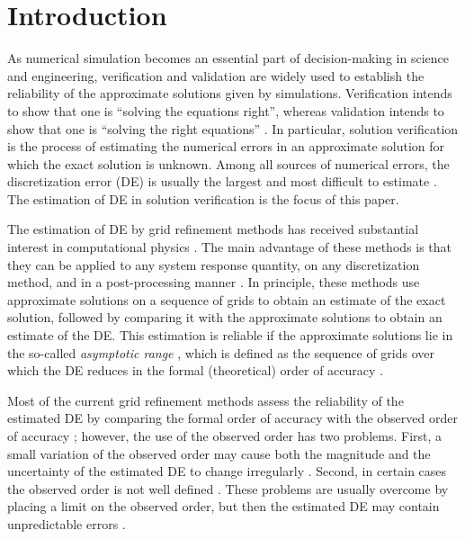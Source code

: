 \section{Introduction} \label{sec:intro}
As numerical simulation becomes an essential part of decision-making in science and engineering, verification and validation \citep{Roache1998VerificationEngineering,Stern2001ComprehensiveProcedures,OberkampfRoy2010} are widely used to establish the reliability of the approximate solutions given by simulations. Verification intends to show that one is ``solving the equations right'', whereas validation intends to show that one is ``solving the right equations'' \citep{Roache1998article}. In particular, solution verification is the process of estimating the numerical errors in an approximate solution for which the exact solution is unknown. Among all sources of numerical errors, the discretization error (DE) is usually the largest and most difficult to estimate \citep{Roy2005,Eca2014AStudies}. The estimation of DE in solution verification is the focus of this paper.

The estimation of DE by grid refinement methods \citep{Roy2010} has received substantial interest in computational physics \citep{Roache1994Perspective:Studies,Eca2014AStudies,Phillips2016ADynamics,Rider2016RobustAnalysis}. The main advantage of these methods is that they can be applied to any system response quantity, on any discretization method, and in a post-processing manner \citep{Stern2001ComprehensiveProcedures,Roy2010}. In principle, these methods use approximate solutions on a sequence of grids to obtain an estimate of the exact solution, followed by comparing it with the approximate solutions to obtain an estimate of the DE. This estimation is reliable if the approximate solutions lie in the so-called \textit{asymptotic range} \citep{Salas2006,Xing2010,Roy2010,Phillips2016ADynamics,Eca2018}, which is defined as the sequence of grids over which the DE reduces in the formal (theoretical) order of accuracy \citep{Roy2010}.

Most of the current grid refinement methods assess the reliability of the estimated DE by comparing the formal order of accuracy with the observed order of accuracy \citep{Roy2010,Orozco2010VerificationSolutions}; however, the use of the observed order has two problems. First, a small variation of the observed order may cause both the magnitude and the uncertainty of the estimated DE to change irregularly \citep{Roy2003,Eca2009,Xing2010,Hodis2012GridAneurysms}. Second, in certain cases the observed order is not well defined \citep{Roy2003,Phillips2014RichardsonDynamics,Phillips2016ADynamics}. These problems are usually overcome by placing a limit on the observed order, but then the estimated DE may contain unpredictable errors \citep{Phillips2014RichardsonDynamics,Phillips2016ADynamics}.

